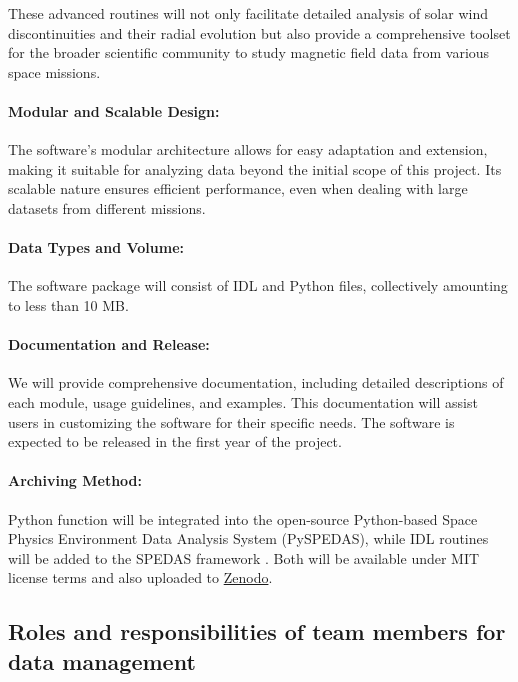 \documentclass[
  letterpaper,
  DIV=11,
  numbers=noendperiod]{scrartcl}
\let\oldparagraph\paragraph
\renewcommand{\paragraph}[1]{\oldparagraph{#1}\mbox{}}
\begin{document}
These advanced routines will not only facilitate detailed analysis of
solar wind discontinuities and their radial evolution but also provide a
comprehensive toolset for the broader scientific community to study
magnetic field data from various space missions.

\paragraph{Modular and Scalable
Design:}\label{modular-and-scalable-design}

The software's modular architecture allows for easy adaptation and
extension, making it suitable for analyzing data beyond the initial
scope of this project. Its scalable nature ensures efficient
performance, even when dealing with large datasets from different
missions.

\paragraph{Data Types and Volume:}\label{data-types-and-volume-1}

The software package will consist of IDL and Python files, collectively
amounting to less than 10 MB.

\paragraph{Documentation and Release:}\label{documentation-and-release}

We will provide comprehensive documentation, including detailed
descriptions of each module, usage guidelines, and examples. This
documentation will assist users in customizing the software for their
specific needs. The software is expected to be released in the first
year of the project.

\paragraph{Archiving Method:}\label{archiving-method-1}

Python function will be integrated into the open-source Python-based
Space Physics Environment Data Analysis System (PySPEDAS), while IDL
routines will be added to the SPEDAS framework \cite{Angelopoulos19}.
Both will be available under MIT license terms and also uploaded to
\href{https://zenodo.org/}{Zenodo}.

\subsection{Roles and responsibilities of team members for data
management}\label{roles-and-responsibilities-of-team-members-for-data-management}
\end{document}
